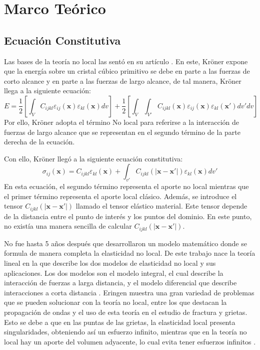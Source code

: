 \section{Marco Teórico}
\label{sc:teoria}

\subsection{Ecuación Constitutiva}
Las bases de la teoría no local las sentó \textcite{Kroner1967} en su artículo \textit{}. En este, Kröner expone que la energía sobre un cristal cúbico primitivo se debe en parte a las fuerzas de corto alcance y en parte a las fuerzas de largo alcance, de tal manera, Kröner llega a la siguiente ecuación:
\begin{equation}
	E=\frac{1}{2}\left[\int_{V}C_{ijkl}\varepsilon_{ij}(\boldsymbol{x})\varepsilon_{kl}(\boldsymbol{x})dv\right]+\frac{1}{2}\left[\int_{V}\int_{V'}C_{ijkl}(\boldsymbol{x})\varepsilon_{ij}(\boldsymbol{x})\varepsilon_{kl}(\boldsymbol{x'})dv'dv\right]
\end{equation}
Por ello, Kröner adopta el término No local para referirse a la interacción de fuerzas de largo alcance que se representan en el segundo término de la parte derecha de la ecuación.

Con ello, Kröner llegó a la siguiente ecuación constitutiva:
\begin{equation}
	\sigma_{ij}(\boldsymbol{x})=C_{ijkl}\varepsilon_{kl}(\boldsymbol{x})+\int_{v'}C_{ijkl}(|\boldsymbol{x}-\boldsymbol{x'}|)\varepsilon_{kl}(\boldsymbol{x})dv'
\end{equation}
En esta ecuación, el segundo término representa el aporte no local mientras que el primer término representa el aporte local clásico. Además, se introduce el tensor $C_{ijkl}(|\boldsymbol{x}-\boldsymbol{x'}|)$ llamado el tensor elástico material. Este tensor depende de la distancia entre el punto de interés y los puntos del dominio. En este punto, no existía una manera sencilla de calcular $C_{ijkl}(|\boldsymbol{x}-\boldsymbol{x'}|)$.

No fue hasta 5 años después que \textcite{Eringen1972} desarrollaron un modelo matemático donde se formula de manera completa la elasticidad no local. De este trabajo nace la teoría lineal en la que \textcite{Eringen1987} describe los dos modelos de elasticidad no local y sus aplicaciones. Los dos modelos son el modelo integral, el cual describe la interacción de fuerzas a larga distancia, y el modelo diferencial que describe interacciones a corta distancia \parencite{Polizzotto2001}. Eringen muestra una gran variedad de problemas que se pueden solucionar con la teoría no local, entre los que destacan la propagación de ondas y el uso de esta teoría en el estudio de fractura y grietas. Esto se debe a que en las puntas de las grietas, la elasticidad local presenta singularidades, obteniendo así un esfuerzo infinito, mientras que en la teoría no local hay un aporte del volumen adyacente, lo cual evita tener esfuerzos infinitos \parencite{Eringen1987}. 

